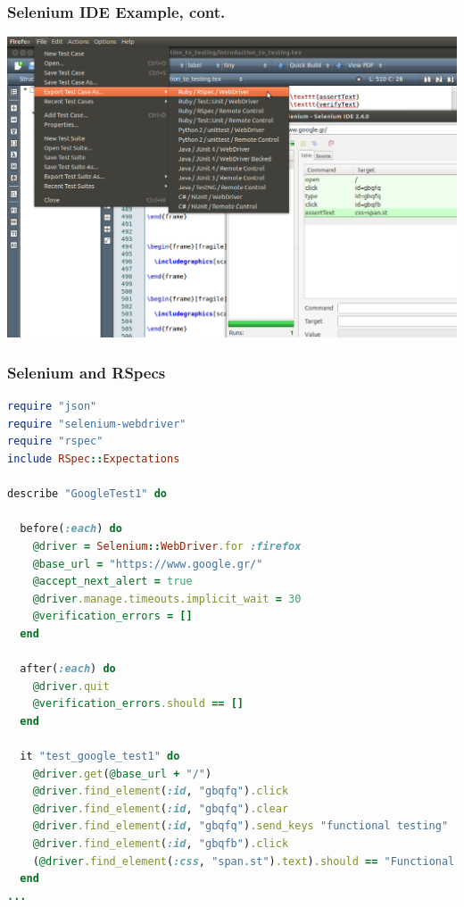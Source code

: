 \documentclass{beamer}
\begin{document}
\begin{frame}[fragile]\frametitle{Selenium IDE Example, cont.} 

  \includegraphics[scale=0.32]{images/export_to_rspec.png}
  
\end{frame}


\begin{frame}[fragile]\frametitle{Selenium and RSpecs} 

  \begin{lstlisting}[language=ruby, basicstyle=\tiny, escapechar={^}]
require "json"
require "selenium-webdriver"
require "rspec"
include RSpec::Expectations

describe "GoogleTest1" do

  before(:each) do
    @driver = Selenium::WebDriver.for :firefox
    @base_url = "https://www.google.gr/"
    @accept_next_alert = true
    @driver.manage.timeouts.implicit_wait = 30
    @verification_errors = []
  end
  
  after(:each) do
    @driver.quit
    @verification_errors.should == []
  end
  
  it "test_google_test1" do
    @driver.get(@base_url + "/")
    @driver.find_element(:id, "gbqfq").click
    @driver.find_element(:id, "gbqfq").clear
    @driver.find_element(:id, "gbqfq").send_keys "functional testing"
    @driver.find_element(:id, "gbqfb").click
    (@driver.find_element(:css, "span.st").text).should == "Functional testing is a quality assurance (QA) process and a type of black box testing that bases its test cases on the specifications of the software component ..."
  end
...
  \end{lstlisting}
  
\end{frame}
\end{document}

